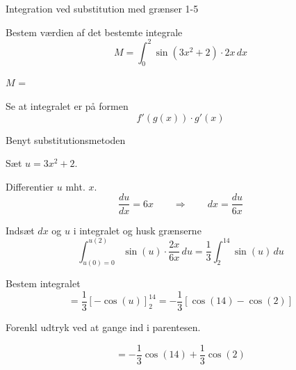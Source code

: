 \documentclass{article}
\begin{document}
\begin{exercise}{Integration ved substitution med grænser 1-5}
	
	
	Bestem værdien af det bestemte integrale
	\[
	M = \int_0^2 \sin(3x^2+2) \cdot 2x \, dx
	\]
	
	$M$ =  \\
	
	
	
	\hint
	
	Se at integralet er på formen
	\[
	f'(g(x)) \cdot g'(x)
	\]
	
	\hint
	
	Benyt substitutionsmetoden
	
	\hint
	
	Sæt $u=3x^2+2$.
	
	
	\hint
	
	Differentier $u$ mht. $x$.
	\[
	\frac{du}{dx} = 6x \qquad	\Rightarrow \qquad dx = \frac{du}{6x}
	\]
	
	\hint
	
	Indsæt $dx$ og $u$ i integralet og husk grænserne
	\[
	\int_{u(0)=0}^{u(2)} \sin(u) \cdot \frac{2x}{6x} \, du = \frac{1}{3} \int_2^{14} \sin(u) \, du
	\]
	
	\hint
	
	Bestem integralet
	\[
	= \frac{1}{3} \left[ -\cos(u) \right]_2^{14} = - \frac{1}{3} \left[ \cos(14) - \cos(2) \right]
	\]
	
	\hint
	Forenkl udtryk ved at gange ind i parentesen.
	
	\hint
	
	\[
	= - \frac{1}{3} \cos(14) + \frac{1}{3} \cos(2)
	\]
	
	
\end{exercise}

\newpage
\end{document}

